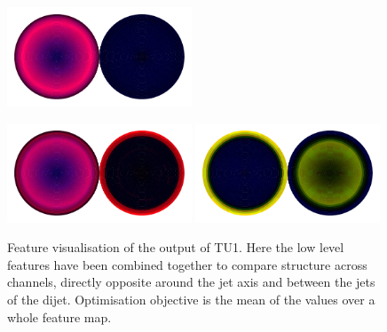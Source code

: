 \begin{figure}[h!]
\begin{center}
        \includegraphics[width=0.49\textwidth]{figures/appendix_featurevis/TU1_40.pdf}
    \end{center}
    \begin{center}
        \includegraphics[width=0.49\textwidth]{figures/appendix_featurevis/TU1_8.pdf}
        \includegraphics[width=0.49\textwidth]{figures/appendix_featurevis/TU1_27.pdf}
    \end{center}
    \caption{Feature visualisation of the output of TU1. Here the low level features have been combined together to compare structure across channels, 
             directly opposite around the jet axis and between the jets of the dijet.
             Optimisation objective is the mean of the values over a whole feature map.}
\end{figure}

